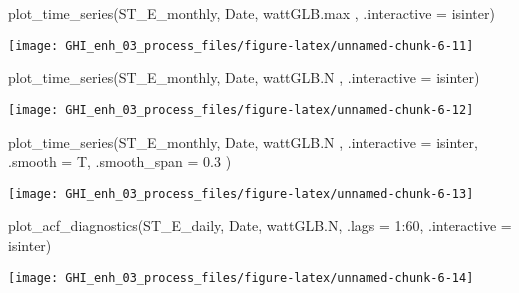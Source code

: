 \documentclass[
  10pt,
  a4paper,oneside]{article}
\newenvironment{Shaded}{\begin{snugshade}}{\end{snugshade}}
\newcommand{\AttributeTok}[1]{\textcolor[rgb]{0.77,0.63,0.00}{#1}}
\newcommand{\DecValTok}[1]{\textcolor[rgb]{0.00,0.00,0.81}{#1}}
\newcommand{\FloatTok}[1]{\textcolor[rgb]{0.00,0.00,0.81}{#1}}
\newcommand{\FunctionTok}[1]{\textcolor[rgb]{0.00,0.00,0.00}{#1}}
\newcommand{\NormalTok}[1]{#1}
\newcommand{\SpecialCharTok}[1]{\textcolor[rgb]{0.00,0.00,0.00}{#1}}
\begin{document}
\begin{Shaded}
\begin{Highlighting}[]
\FunctionTok{plot\_time\_series}\NormalTok{(ST\_E\_monthly, Date, wattGLB.max , }\AttributeTok{.interactive =}\NormalTok{ isinter)}
\end{Highlighting}
\end{Shaded}

\begin{center}\texttt{[image: GHI\_enh\_03\_process\_files/figure-latex/unnamed-chunk-6-11]} \end{center}

\begin{Shaded}
\begin{Highlighting}[]
\FunctionTok{plot\_time\_series}\NormalTok{(ST\_E\_monthly, Date, wattGLB.N   , }\AttributeTok{.interactive =}\NormalTok{ isinter)}
\end{Highlighting}
\end{Shaded}

\begin{center}\texttt{[image: GHI\_enh\_03\_process\_files/figure-latex/unnamed-chunk-6-12]} \end{center}

\begin{Shaded}
\begin{Highlighting}[]
\FunctionTok{plot\_time\_series}\NormalTok{(ST\_E\_monthly, Date, wattGLB.N   , }\AttributeTok{.interactive =}\NormalTok{ isinter, }\AttributeTok{.smooth =}\NormalTok{ T, }\AttributeTok{.smooth\_span =} \FloatTok{0.3}\NormalTok{ )}
\end{Highlighting}
\end{Shaded}

\begin{center}\texttt{[image: GHI\_enh\_03\_process\_files/figure-latex/unnamed-chunk-6-13]} \end{center}

\begin{Shaded}
\begin{Highlighting}[]
\FunctionTok{plot\_acf\_diagnostics}\NormalTok{(ST\_E\_daily, Date, wattGLB.N, }\AttributeTok{.lags =} \DecValTok{1}\SpecialCharTok{:}\DecValTok{60}\NormalTok{, }\AttributeTok{.interactive =}\NormalTok{ isinter)}
\end{Highlighting}
\end{Shaded}

\begin{center}\texttt{[image: GHI\_enh\_03\_process\_files/figure-latex/unnamed-chunk-6-14]} \end{center}
\end{document}
